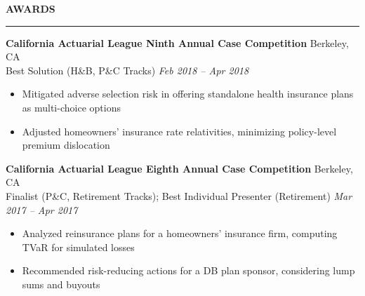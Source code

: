 \documentclass[11pt,letterpaper]{article}
\newcommand{\sectline}{\vspace{3pt}\hrule height 1.5pt\vspace{3pt}}
\newcommand{\smallspace}{\vspace{4pt}}
\begin{document}
\textbf{AWARDS} \sectline


\textbf{California Actuarial League Ninth Annual Case Competition} \hfill Berkeley, CA \\
Best Solution (H\&B, P\&C Tracks) \hfill \textit{Feb 2018 -- Apr 2018} \\
\begin{itemize}
	\item Mitigated adverse selection risk in offering standalone health insurance plans as multi-choice options
	\item Adjusted homeowners' insurance rate relativities, minimizing policy-level premium dislocation 
\end{itemize}
\smallspace 
\textbf{California Actuarial League Eighth Annual Case Competition} \hfill Berkeley, CA \\
Finalist (P\&C, Retirement Tracks); Best Individual Presenter (Retirement) \hfill \textit{Mar 2017 -- Apr 2017} \\
\begin{itemize}
	\item Analyzed reinsurance plans for a homeowners' insurance firm, computing TVaR for simulated losses
	\item Recommended risk-reducing actions for a DB plan sponsor, considering lump sums and buyouts 
\end{itemize}
\end{document}
